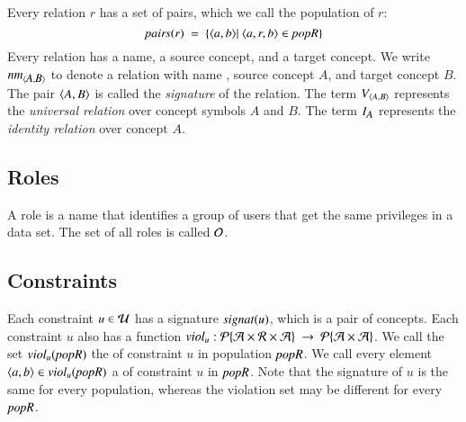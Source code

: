 \documentclass{elsarticle}
\begin{document}
	Every relation $r$ has a set of pairs, which we call the population of $r$:
\begin{equation}
	\pairs{r}\ =\ \{ \pair{a}{b}|\ \triple{a}{r}{b}\in\popR\}
\end{equation}
	Every relation has a name, a source concept, and a target concept.
	We write $\text{\it nm\/}_{\langle{\text{\it \small A\/}},{\text{\it \small B\/}}\rangle}$ to denote a relation with name , source concept $A$, and target concept $B$.
	The pair $\langle{A},{B}\rangle$ is called the \emph{signature} of the relation.
	The term $V_{\langle{A},{B}\rangle}$ represents the \emph{universal relation} over concept symbols $A$ and $B$.
	The term $I_{\text{\it \small A\/}}$ represents the \emph{identity relation} over concept $A$.

\subsection{Roles}
	A role is a name that identifies a group of users that get the same privileges in a data set.
	The set of all roles is called $\mathcal{O}$.

\subsection{Constraints}
	Each constraint $u\in\mathcal{U}$ has a signature $\text{\it signat\/}(u)$, which is a pair of concepts.
	Each constraint $u$ also has a function $\id{viol}_u:\powerset{\atoms\times\rels\times\atoms}\ \rightarrow\ \powerset{\atoms\times\atoms}$.
	We call the set $\text{\it viol\/}_{u}(\text{\it popR\/})$ the  of constraint $u$ in population $\text{\it popR\/}$.
	We call every element $\langle{a},{b}\rangle\in\text{\it viol\/}_{u}(\text{\it popR\/})$ a  of constraint $u$ in $\text{\it popR\/}$.
	Note that the signature of $u$ is the same for every population, whereas the violation set may be different for every $\text{\it popR\/}$.
\end{document}
